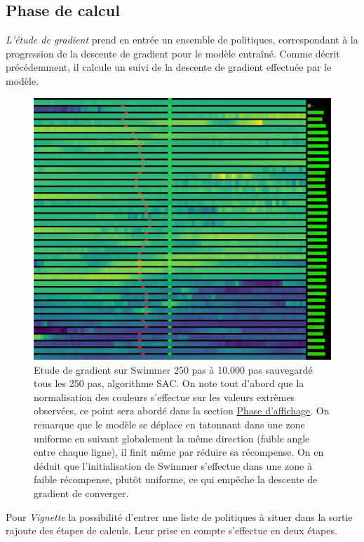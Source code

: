 \documentclass[12pt]{article}
\begin{document}
\subsection{Phase de calcul}

\emph{L'étude de gradient} prend en entrée un ensemble de politiques, correspondant à la progression de la descente de gradient pour le modèle entraîné. Comme décrit précédemment, il calcule un suivi de la descente de gradient effectuée par le modèle. \\

\begin{figure}[htp]
    \centering
    \includegraphics[width=15cm]{Images/gradientStudy_swimmer}
    \caption{Etude de gradient sur Swimmer 250 pas à 10.000 pas sauvegardé tous les 250 pas, algorithme SAC. On note tout d'abord que la normalisation des couleurs s'effectue sur les valeurs extrèmes observées, ce point sera abordé dans la section \hyperref[sec:affichage]{Phase d'affichage}. On remarque que le modèle se déplace en tatonnant dans une zone uniforme en suivant globalement la même direction (faible angle entre chaque ligne), il finit même par réduire sa récompense. On en déduit que l'initialisation de Swimmer s'effectue dans une zone à faible récompense, plutôt uniforme, ce qui empêche la descente de gradient de converger.}
    \label{fig:gradientStudy}
\end{figure}

Pour \emph{Vignette} la possibilité d'entrer une liste de politiques à situer dans la sortie rajoute des étapes de calculs. Leur prise en compte s'effectue en deux étapes. \\
\end{document}
